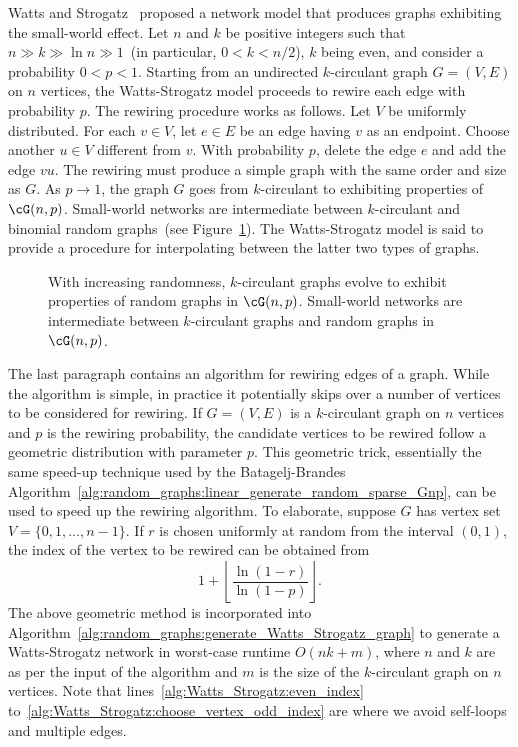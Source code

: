 Watts and
Strogatz~\cite{Watts1999a,Watts1999b,WattsStrogatz1998}
proposed a network model that produces graphs exhibiting the
small-world effect. Let $n$ and $k$ be positive integers such that
$n \gg k \gg \ln n \gg 1$~(in particular, $0 < k < n/2$), $k$ being
even, and consider a probability $0 < p < 1$. Starting from an
undirected $k$-circulant graph
$G = (V,E)$ on $n$ vertices, the
Watts-Strogatz model proceeds to rewire
each edge with probability $p$. The rewiring procedure works as
follows. Let $V$ be uniformly distributed. For each $v \in V$, let
$e \in E$ be an edge having $v$ as an endpoint. Choose another
$u \in V$ different from $v$. With probability $p$, delete the edge
$e$ and add the edge $vu$. The rewiring must produce a
simple graph with the same order and size as
$G$. As $p \to 1$, the graph $G$ goes from $k$-circulant to exhibiting
properties of $\cG(n,p)$. Small-world
networks are intermediate between $k$-circulant and binomial random
graphs~(see
Figure~\ref{fig:random_graphs:k_circulant_small_world_random}). The
Watts-Strogatz model is said to provide a procedure for interpolating
between the latter two types of graphs.

\begin{figure}[!htbp]
\centering

\caption{With increasing randomness, $k$-circulant graphs evolve to
  exhibit properties of random graphs in $\cG(n,p)$. Small-world
  networks are intermediate between $k$-circulant graphs and random
  graphs in $\cG(n,p)$.}
\label{fig:random_graphs:k_circulant_small_world_random}
\end{figure}

The last paragraph contains an algorithm for rewiring edges of a
graph. While the algorithm is simple, in practice it potentially skips
over a number of vertices to be considered for rewiring. If
$G = (V,E)$ is a $k$-circulant graph on $n$ vertices and $p$ is the
rewiring probability, the candidate vertices to be rewired follow a
geometric distribution with parameter $p$. This geometric trick,
essentially the same speed-up technique used by the Batagelj-Brandes
Algorithm~\ref{alg:random_graphs:linear_generate_random_sparse_Gnp},
can be used to speed up the rewiring algorithm. To elaborate, suppose
$G$ has vertex set $V = \{0, 1, \dots, n-1\}$. If $r$ is chosen
uniformly at random from the interval $(0,1)$, the index of the vertex
to be rewired can be obtained from
\[
1 + \left\lfloor \frac{\ln(1 - r)} {\ln(1 - p)} \right\rfloor.
\]
The above geometric method is incorporated into
Algorithm~\ref{alg:random_graphs:generate_Watts_Strogatz_graph} to
generate a Watts-Strogatz network in worst-case runtime
$O(nk + m)$, where $n$ and $k$ are as per the input of the algorithm
and $m$ is the size of the $k$-circulant graph on $n$ vertices. Note
that lines~\ref{alg:Watts_Strogatz:even_index}
to~\ref{alg:Watts_Strogatz:choose_vertex_odd_index} are where we avoid
self-loops and multiple edges.

